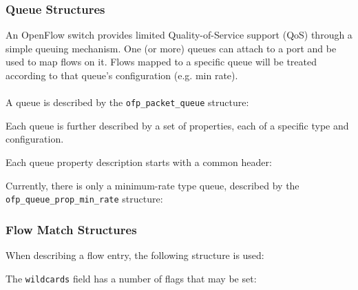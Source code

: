 \subsubsection{Queue Structures}
\label{cts:qos}
An OpenFlow switch provides limited Quality-of-Service support
  (QoS) through a simple queuing
mechanism. One (or more) queues can attach to a port and be used to map flows
on it. Flows mapped to a specific queue will be treated according to
that queue's configuration (e.g. min rate).
\\\\
A queue is described by the \verb|ofp_packet_queue| structure:

Each queue is further described by a set of properties, each of a
specific type and configuration.

Each queue property description starts with a common header:

Currently, there is only a minimum-rate type queue, described by the
\verb|ofp_queue_prop_min_rate| structure:


\subsubsection{Flow Match Structures}
When describing a flow entry, the following structure is used:


The \verb|wildcards| field has a number of flags that may be set:



